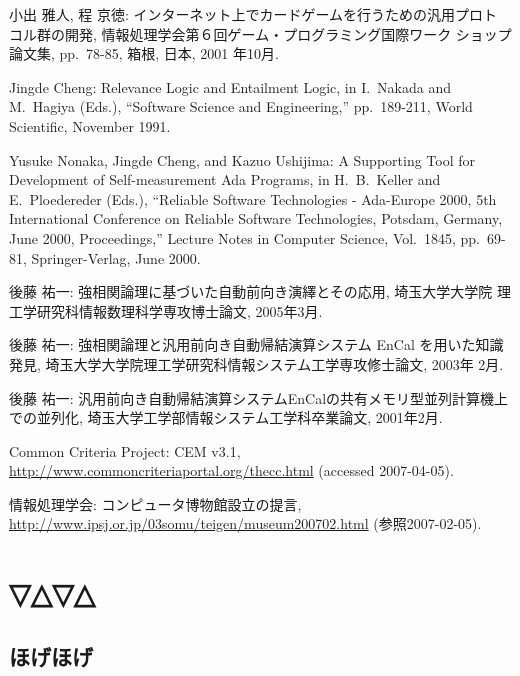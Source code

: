 \documentclass[12pt,dvipdfmx]{jreport}
\begin{document}
\begin{thebibliography}{99}
小出 雅人, 程 京徳: インターネット上でカードゲームを行うための汎用プロト
        コル群の開発, 情報処理学会第６回ゲーム・プログラミング国際ワーク
        ショップ論文集, pp.\ 78-85, 箱根, 日本, 2001 年10月.

Jingde Cheng: Relevance Logic and Entailment Logic, in I.\ Nakada and
        M.\ Hagiya (Eds.), ``Software Science and Engineering,''
        pp.\ 189-211, World Scientific, November 1991.

Yusuke Nonaka, Jingde Cheng, and Kazuo Ushijima: A Supporting Tool for
        Development of Self-measurement Ada Programs, in H.\ B.\ Keller
        and E.\ Ploedereder (Eds.), ``Reliable Software Technologies -
        Ada-Europe 2000, 5th International Conference on Reliable
        Software Technologies, Potsdam, Germany, June 2000,
        Proceedings,'' Lecture Notes in Computer Science, Vol.\ 1845,
        pp.\ 69-81, Springer-Verlag, June 2000.


後藤 祐一: 強相関論理に基づいた自動前向き演繹とその応用, 埼玉大学大学院
	理工学研究科情報数理科学専攻博士論文, 2005年3月.

後藤 祐一: 強相関論理と汎用前向き自動帰結演算システム EnCal を用いた知識
	発見, 埼玉大学大学院理工学研究科情報システム工学専攻修士論文, 2003年
	2月.

後藤 祐一: 汎用前向き自動帰結演算システムEnCalの共有メモリ型並列計算機上
	での並列化, 埼玉大学工学部情報システム工学科卒業論文, 2001年2月.


Common Criteria Project: CEM v3.1,
\url{http://www.commoncriteriaportal.org/thecc.html}
(accessed 2007-04-05).

情報処理学会: コンピュータ博物館設立の提言, \url{http://www.ipsj.or.jp/03somu/teigen/museum200702.html} (参照2007-02-05).

\end{thebibliography}

\appendix %
\chapter{▽△▽△}
\section{ほげほげ}
\end{document}
